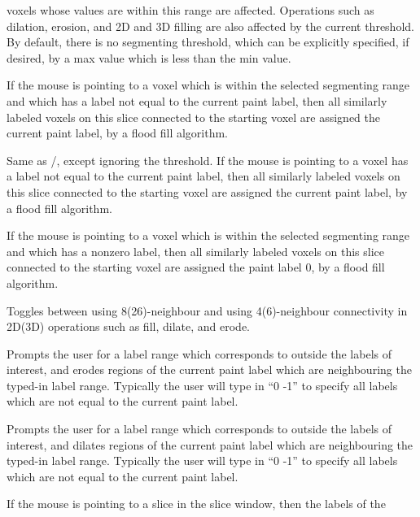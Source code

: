 \documentclass{article}
\newcommand{\menutwo}[2]{{\scriptsize \fbox{\bf #1}/\fbox{\bf #2}}}
\begin{document}
\begin{description}
    voxels whose values are within this range are affected.  Operations
    such as dilation, erosion, and 2D and 3D filling are also affected by
    the current threshold.  By
    default, there is no segmenting threshold, which can be explicitly
    specified, if desired, by a max value which is less than the min value.
\item[\menutwo{Segmenting}{Label Fill}]  If the mouse is pointing
    to a voxel which is within the selected segmenting range and which
    has a label not equal to the current paint label, then all similarly
    labeled voxels on this slice connected
    to the starting voxel are assigned the current paint label, by a
    flood fill algorithm.
\item[\menutwo{Segmenting}{Label Fill No Thrs}]  Same as
    \menutwo{Segmenting}{Label Fill}, except ignoring the threshold.
    If the mouse is pointing to a voxel has a label not equal to the
    current paint label, then all
    similarly labeled voxels on this slice connected
    to the starting voxel are assigned the current paint label, by a
    flood fill algorithm.
\item[\menutwo{Segmenting}{Clear Fill}]  If the mouse is pointing
    to a voxel which is within the selected segmenting range and which
    has a nonzero label, then all similarly labeled voxels on this slice
    connected to the starting voxel are assigned the paint label 0, by a
    flood fill algorithm.
\item[\menutwo{Segmenting}{Connectivity}]  Toggles between using
    8(26)-neighbour
    and using 4(6)-neighbour connectivity in 2D(3D) operations such as fill,
    dilate, and erode.
\item[\menutwo{Segmenting}{Erode 3D}]  Prompts the user for a label range
    which corresponds to outside the labels of interest, and erodes regions
    of the current paint label which are neighbouring the typed-in label
    range.  Typically the user will type in ``0 -1'' to specify all labels
    which are not equal to the current paint label.
\item[\menutwo{Segmenting}{Dilate 3D}]  Prompts the user for a label range
    which corresponds to outside the labels of interest, and dilates regions
    of the current paint label which are neighbouring the typed-in label
    range.  Typically the user will type in ``0 -1'' to specify all labels
    which are not equal to the current paint label.
\item[\menutwo{Segmenting}{Copy from Rt/Sup/Ant}]  If the mouse is
    pointing to a slice in the slice window, then the labels of the

\end{description}
\end{document}
